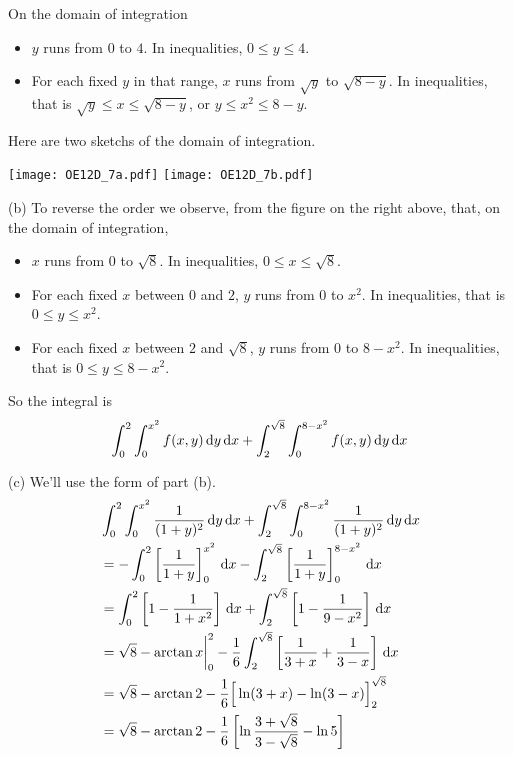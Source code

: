 \begin{solution}
On the domain of integration 
\begin{itemize}
\item
$y$ runs from $0$ to $4$. In inequalities, $0\le y\le 4$.
\item
For each fixed $y$ in that range, $x$ runs from $\sqrt{y}$ to
$\sqrt{8-y}$. In inequalities, that is $\sqrt{y}\le x\le \sqrt{8-y}$,
or $y\le x^2\le 8-y$.
\end{itemize}
Here are two sketchs of the domain of integration.

\begin{center}
     \texttt{[image: OE12D\_7a.pdf]}\qquad\qquad
     \texttt{[image: OE12D\_7b.pdf]}
\end{center}


(b) To reverse the order we observe, from the figure on the right above,
that, on the domain of integration,
\begin{itemize}
\item
$x$ runs from $0$ to $\sqrt{8}$. In inequalities, $0\le x\le \sqrt{8}$.
\item
For each fixed $x$ between $0$ and $2$, $y$ runs from $0$ to
$x^2$. In inequalities, that is $0\le y\le x^2$.
\item
For each fixed $x$ between $2$ and $\sqrt{8}$, $y$ runs from $0$ to
$8-x^2$. In inequalities, that is $0\le y\le 8-x^2$.
\end{itemize}
So the integral is
\begin{equation*}
\int_0^2\int_0^{x^2} f(x,y)\,\mathrm{d}y\,\mathrm{d}x
+\int_2^{\sqrt{8}}\int_0^{8-x^2} f(x,y)\,\mathrm{d}y\,\mathrm{d}x
\end{equation*}

(c) We'll use the form of part (b).
\begin{align*}
&\int_0^2\int_0^{x^2} \frac{1}{(1+y)^2}\,\mathrm{d}y\,\mathrm{d}x
+\int_2^{\sqrt{8}}\int_0^{8-x^2} \frac{1}{(1+y)^2}\,\mathrm{d}y\,\mathrm{d}x \\
&=-\int_0^2 \left[\frac{1}{1+y}\right]_0^{x^2}\,\mathrm{d}x
-\int_2^{\sqrt{8}} \left[\frac{1}{1+y}\right]_0^{8-x^2}\,\mathrm{d}x \\
&=\int_0^2 \left[1-\frac{1}{1+x^2}\right]\,\mathrm{d}x
+\int_2^{\sqrt{8}} \left[1-\frac{1}{9-x^2}\right]\,\mathrm{d}x \\
&=\sqrt{8}-\arctan x\bigg|_0^2
  -\frac{1}{6}\int_2^{\sqrt{8}} 
         \left[\frac{1}{3+x}+\frac{1}{3-x}\right]\,\mathrm{d}x \\
&=\sqrt{8}-\arctan 2 -\frac{1}{6}\Big[\ln(3+x)-\ln(3-x)\Big]_2^{\sqrt{8}} \\
&=\sqrt{8}-\arctan 2 -\frac{1}{6}\left[\ln\frac{3+\sqrt{8}}{3-\sqrt{8}}
                                       -\ln 5\right] 
\end{align*}
\end{solution}

